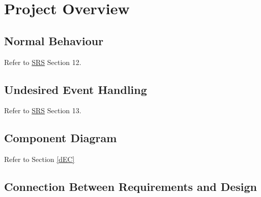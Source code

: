\documentclass[12pt, titlepage]{article}
\begin{document}
\section{Project Overview}

\subsection{Normal Behaviour}

Refer to \href{https://github.com/zakerl/Capstone_Project/blob/main/docs/SRS/SRS.pdf}{SRS} Section 12.

\subsection{Undesired Event Handling}

Refer to \href{https://github.com/zakerl/Capstone_Project/blob/main/docs/SRS/SRS.pdf}{SRS} Section 13.

\subsection{Component Diagram}

Refer to Section \ref{dEC}

\subsection{Connection Between Requirements and Design} \label{SecConnection}
\end{document}
